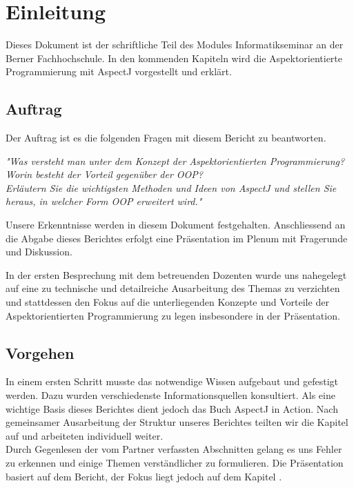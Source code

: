 \chapter{Einleitung}
\label{chap:einleitung}

Dieses Dokument ist der schriftliche Teil des Modules Informatikseminar an der Berner Fachhochschule. In den kommenden Kapiteln wird die Aspektorientierte Programmierung mit AspectJ vorgestellt und erklärt.

\nocite{laddad:aspectj}

\section{Auftrag}
\label{sec:einleitung_auftrag}

Der Auftrag ist es die folgenden Fragen mit diesem Bericht zu beantworten.

\textit{"Was versteht man unter dem Konzept der Aspektorientierten Programmierung?\\
Worin besteht der Vorteil gegenüber der OOP? \\
Erläutern Sie die wichtigsten Methoden und Ideen von AspectJ und stellen Sie heraus, in welcher Form OOP erweitert wird."} \cite{moodle:auftrag}

Unsere Erkenntnisse werden in diesem Dokument festgehalten. Anschliessend an die Abgabe dieses Berichtes erfolgt eine Präsentation im Plenum mit Fragerunde und Diskussion. 

In der ersten Besprechung mit dem betreuenden Dozenten wurde uns nahegelegt auf eine zu technische und detailreiche Ausarbeitung des Themas zu verzichten und stattdessen den Fokus auf die unterliegenden Konzepte und Vorteile der Aspektorientierten Programmierung zu legen insbesondere in der Präsentation.

\section{Vorgehen}
\label{sec:einleitung_vorgehen}

In einem ersten Schritt musste das notwendige Wissen aufgebaut und gefestigt werden. Dazu wurden verschiedenste Informationsquellen konsultiert. Als eine wichtige Basis dieses Berichtes dient jedoch das Buch \glqq AspectJ in Action\grqq \cite{laddad:aspectj}. Nach gemeinsamer Ausarbeitung der Struktur unseres Berichtes teilten wir die Kapitel auf und arbeiteten individuell weiter. \\
Durch Gegenlesen der vom Partner verfassten Abschnitten gelang es uns Fehler zu erkennen und einige Themen verständlicher zu formulieren. Die Präsentation basiert auf dem Bericht, der Fokus liegt jedoch auf dem Kapitel .